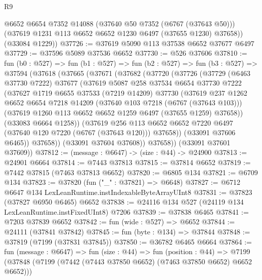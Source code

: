 \begin{lexlean}{R9}
\begin{coremodule}
        @6652
        @6654
        @7352
        @14088
        (@37640 @50 @7352 (@6767 (@37643 @50)))
        (@37619 @1231 @113 @6652 @6652 @1230 @6497 (@37655 @1230) @37658))
      (@33084 @1229))
@37726 := @37619 @5090 @113 @37538 @6652 @37677 @6497
@37729 := @37596 @5089 @37536 @6652
@37730 := @526 @37606
@37810 := fun (b0 : @527) =>
  fun (b1 : @527) =>
  fun (b2 : @527) =>
  fun (b3 : @527) =>
  @37594
    (@37618
      (@37665
        (@37671
          (@37682
            (@37720
              (@37726
                (@37729
                  (@6463 @37730 @7222)
                  @37677
                  (@37619
                    @5087
                    @258
                    @37534
                    @6654
                    @37730
                    @7222
                    (@37627
                      @1719
                      @6655
                      @37533
                      (@7219 @14209)
                      @37730
                      (@37619
                        @237
                        @1262
                        @6652
                        @6654
                        @7218
                        @14209
                        (@37640 @103 @7218 (@6767 (@37643 @103)))
                        (@37619 @1260 @113 @6652 @6652 @1259 @6497 (@37655 @1259) @37658))
                      (@33083 @6664 @1258))
                    (@37619
                      @256
                      @113
                      @6652
                      @6652
                      @7220
                      @6497
                      (@37640 @120 @7220 (@6767 (@37643 @120)))
                      @37658))
                  (@33091 @37606 @6465))
                @37658))
            (@33091 @37604 @37608))
          @37658))
      (@33091 @37601 @37609))
@37812 := (message : @6647) -> (size : @44) -> @24900
@37813 := @24901 @6664
@37814 := @7443 @37813
@37815 := @37814 @6652
@37819 := @7442 @37815 (@7463 @37813 @6652)
@37820 := @6805 @134
@37821 := @6709 @134
@37823 := @37820 (fun ("_" : @37821) => @6648)
@37827 := @6712 @6647 @134 LexLeanRuntime.instIndexableByteArrayUInt8
@37831 := @37823 (@37827 @6950 @6465) @6652
@37838 := @24116 @134 @527 (@24119 @134 LexLeanRuntime.instFixedUInt8) @7206
@37839 := @37838 @6465
@37841 := @7203 @37839 @6652
@37842 := fun (wide : @527) => @6652
@37844 := @24111 (@37841 @37842)
@37845 := fun (byte : @134) => @37844
@37848 := @37819 (@7199 (@37831 @37845))
@37850 := @36782 @6465 @6664
@37864 := fun (message : @6647) =>
  fun (size : @44) =>
  fun (position : @44) =>
  @7199 (@37848 (@7199 (@7442 (@7443 @37850 @6652) (@7463 @37850 @6652) @6652 @6652)))

\end{coremodule}
\end{lexlean}
